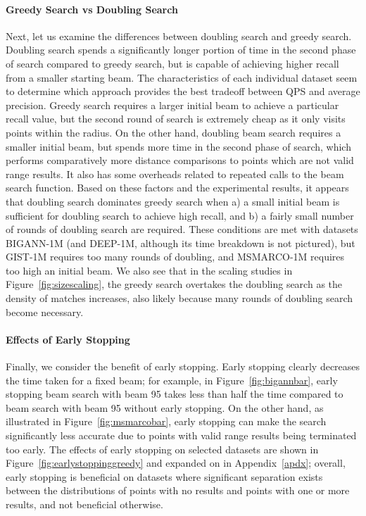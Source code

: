 \paragraph{Greedy Search vs Doubling Search} Next, let us examine the differences between doubling search and greedy search. Doubling search spends a significantly longer portion of time in the second phase of search compared to greedy search, but is capable of achieving higher recall from a smaller starting beam. The characteristics of each individual dataset seem to determine which approach provides the best tradeoff between QPS and average precision. Greedy search requires a larger initial beam to achieve a particular recall value, but the second round of search is extremely cheap as it only visits points within the radius. On the other hand, doubling beam search requires a smaller initial beam, but spends more time in the second phase of search, which performs comparatively more distance comparisons to points which are not valid range results. It also has some overheads related to repeated calls to the beam search function. Based on these factors and the experimental results, it appears that doubling search dominates greedy search when a) a small initial beam is sufficient for doubling search to achieve high recall, and b) a fairly small number of rounds of doubling search are required. These conditions are met with datasets BIGANN-1M (and DEEP-1M, although its time breakdown is not pictured), but GIST-1M requires too many rounds of doubling, and MSMARCO-1M requires too high an initial beam. We also see that in the scaling studies in Figure~\ref{fig:sizescaling}, the greedy search overtakes the doubling search as the density of matches increases, also likely because many rounds of doubling search become necessary.

\paragraph{Effects of Early Stopping} Finally, we consider the benefit of early stopping. Early stopping clearly decreases the time taken for a fixed beam; for example, in Figure~\ref{fig:bigannbar}, early stopping beam search with beam 95 takes less than half the time compared to beam search with beam 95 without early stopping. On the other hand, as illustrated in Figure~\ref{fig:msmarcobar}, early stopping can make the search significantly less accurate due to points with valid range results being terminated too early. The effects of early stopping on selected datasets are shown in Figure~\ref{fig:earlystoppinggreedy} and expanded on in Appendix~\ref{apdx}; overall, early stopping is beneficial on datasets where significant separation exists between the distributions of points with no results and points with one or more results, and not beneficial otherwise.

